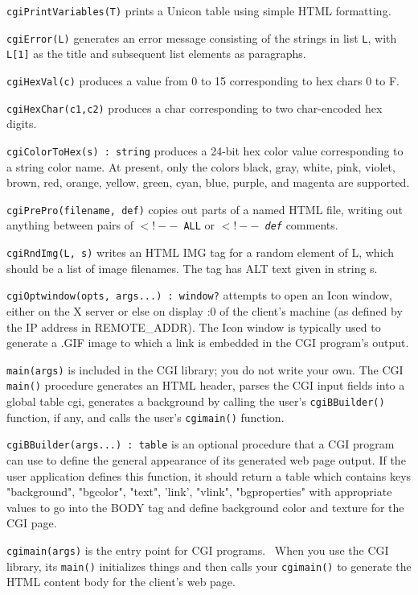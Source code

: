 \texttt{cgiPrintVariables(T)} prints a Unicon table
using simple HTML formatting. 

\texttt{cgiError(L)} generates an error message consisting of the
strings in list \texttt{L}, with \texttt{L[1]} as the title and
subsequent list elements as paragraphs.

\texttt{cgiHexVal(c)} produces a value from 0 to 15 corresponding to
hex chars 0 to F. 

\texttt{cgiHexChar(c1,c2)} produces a char corresponding to
two char-encoded hex digits. 

\texttt{cgiColorToHex(s) : string} produces a 24-bit hex color value
corresponding to a string color name. At present, only the colors
black, gray, white, pink, violet, brown, red, orange, yellow, green,
cyan, blue, purple, and magenta are supported. 

\texttt{cgiPrePro(filename, def)} copies out parts of a
named HTML file, writing out anything between pairs of \texttt{$<!--$ ALL}
or \texttt{$<!--$ {\em def\/}} comments.

\texttt{cgiRndImg(L, s)} writes an HTML IMG tag for a random element of
L, which should be a list of image filenames. The tag has ALT text
given in string s. 

\texttt{cgiOptwindow(opts, args...) : window?} attempts to open an Icon
window, either on the X server or else on display :0 of the
client's machine (as defined by the IP address in
REMOTE\_ADDR). The Icon window is typically used to generate a .GIF
image to which a link is embedded in the CGI
program's output. 

\texttt{main(args)} is included in the CGI library; you do not write
your own. The CGI \texttt{main()} procedure generates an HTML header,
parses the CGI input fields into a global table cgi, generates a
background by calling the user's
\texttt{cgiBBuilder()} function, if any, and calls the
user's \texttt{cgimain()} function. 

\texttt{cgiBBuilder(args...) : table} is an optional procedure that a
CGI program can use to define the general appearance of its
generated web page output. If the user application defines this
function, it should return a table which contains keys
"background",
"bgcolor",
"text", 'link',
"vlink",
"bgproperties" with appropriate values to
go into the BODY tag and define background color and texture for the
CGI page. 

\texttt{cgimain(args)} is the entry point for CGI programs. \ When you
use the CGI library, its \texttt{main()} initializes things and then
calls your \texttt{cgimain()} to generate the HTML content body for the
client's web page. 

